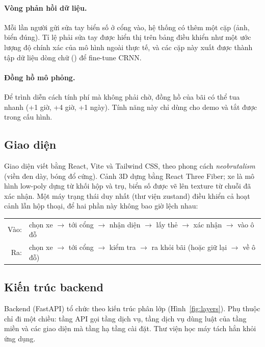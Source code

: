 \paragraph{Vòng phản hồi dữ liệu.} Mỗi lần người gửi sửa tay biển số ở cổng vào, hệ thống có thêm một cặp (ảnh, biển đúng). Tỉ lệ phải sửa tay được hiển thị trên bảng điều khiển như một ước lượng độ chính xác của mô hình ngoài thực tế, và các cặp này xuất được thành tập dữ liệu dòng chữ () để fine-tune CRNN.

\paragraph{Đồng hồ mô phỏng.} Để trình diễn cách tính phí mà không phải chờ, đồng hồ của bãi có thể tua nhanh (+1 giờ, +4 giờ, +1 ngày). Tính năng này chỉ dùng cho demo và tắt được trong cấu hình.

\subsection{Giao diện}
Giao diện viết bằng React, Vite và Tailwind CSS, theo phong cách \emph{neobrutalism} (viền đen dày, bóng đổ cứng). Cảnh 3D dựng bằng React Three Fiber; xe là mô hình low-poly dựng từ khối hộp và trụ, biển số được vẽ lên texture từ chuỗi đã xác nhận. Một máy trạng thái duy nhất (thư viện zustand) điều khiển cả hoạt cảnh lẫn hộp thoại, để hai phần này không bao giờ lệch nhau:
\begin{center}
\footnotesize
\begin{tabular}{rl}
Vào: & chọn xe $\to$ tới cổng $\to$ nhận diện $\to$ lấy thẻ $\to$ xác nhận $\to$ vào ô đỗ \\
Ra: & chọn xe $\to$ tới cổng $\to$ kiểm tra $\to$ ra khỏi bãi (hoặc giữ lại $\to$ về ô đỗ)
\end{tabular}
\end{center}

\subsection{Kiến trúc backend}
Backend (FastAPI) tổ chức theo kiến trúc phân lớp (Hình~\ref{fig:layers}). Phụ thuộc chỉ đi một chiều: tầng API gọi tầng dịch vụ, tầng dịch vụ dùng luật của tầng miền và các giao diện mà tầng hạ tầng cài đặt. Thư viện học máy  tách hẳn khỏi ứng dụng.

